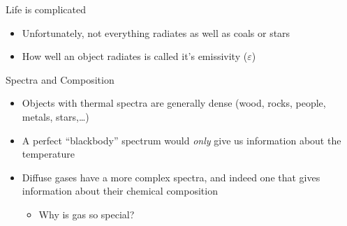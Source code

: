 \documentclass[pdf,xcolor={rgb},aspectratio=169]{beamer}
\begin{document}
\begin{frame}{Life is complicated}
  \begin{itemize}
	\item Unfortunately, not everything radiates as well as coals or stars
	\item How well an object radiates is called it's emissivity ($\varepsilon$)
  \end{itemize}
  \begin{center}
  \end{center}
\end{frame}


\begin{frame}{Spectra and Composition}
  \begin{itemize}
	\item Objects with thermal spectra are generally dense (wood, rocks, people, metals, stars,\ldots)
	\item A perfect ``blackbody'' spectrum would \emph{only} give us information about the temperature
	\item Diffuse gases have a more complex spectra, and indeed one that gives information about their chemical composition
	  \begin{itemize}[<2->]
		\item \alert{Why is gas so special?}
	  \end{itemize}
  \end{itemize}
\end{frame}
\end{document}
